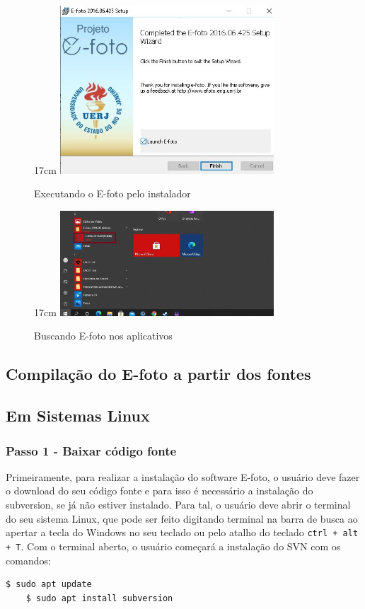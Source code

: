 \begin{figure}[!ht]{17cm}
	\centering
	\includegraphics[width=8cm]{Figuras/launch1.jpg}
	\caption{Executando o E-foto pelo instalador} \label{fig:launch1}
\end{figure}

\begin{figure}[!ht]{17cm}
	\centering
	\includegraphics[width=8cm]{Figuras/launch2.jpg}
	\caption{Buscando E-foto nos aplicativos} \label{fig:launch2}
\end{figure}



\subsection{Compilação do E-foto a partir dos fontes}
\subsection{Em Sistemas Linux}

\subsubsection{Passo 1 - Baixar código fonte}
Primeiramente, para realizar a instalação do software E-foto, o usuário deve fazer o download do seu código fonte e para isso é necessário a instalação do subversion, se já não estiver instalado. Para tal, o usuário deve abrir o terminal do seu sistema Linux, que pode ser feito digitando terminal na barra de busca ao apertar a tecla do Windows no seu teclado ou pelo atalho do teclado \texttt{ctrl + alt + T}. Com o terminal aberto, o usuário começará a instalação do SVN com os comandos: 
\begin{lstlisting}[language=bash]
	$ sudo apt update
	$ sudo apt install subversion
\end{lstlisting}

